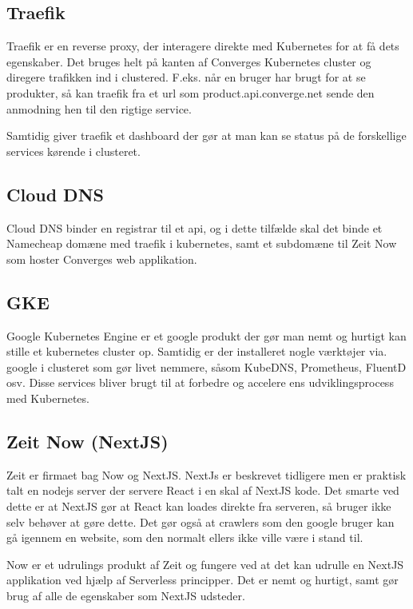 \subsection{Traefik}

Traefik er en reverse proxy, der interagere direkte med Kubernetes for at få dets egenskaber. Det bruges helt på kanten af Converges Kubernetes cluster og diregere trafikken ind i clustered. F.eks. når en bruger har brugt for at se produkter, så kan traefik fra et url som product.api.converge.net sende den anmodning hen til den rigtige service.

Samtidig giver traefik et dashboard der gør at man kan se status på de forskellige services kørende i clusteret.

\subsection{Cloud DNS}

Cloud DNS binder en registrar til et api, og i dette tilfælde skal det binde et Namecheap domæne med traefik i kubernetes, samt et subdomæne til Zeit Now som hoster Converges web applikation.

\subsection{GKE}

Google Kubernetes Engine er et google produkt der gør man nemt og hurtigt kan stille et kubernetes cluster op. Samtidig er der installeret nogle værktøjer via. google i clusteret som gør livet nemmere, såsom KubeDNS, Prometheus, FluentD osv. Disse services bliver brugt til at forbedre og accelere ens udviklingsprocess med Kubernetes.

\subsection{Zeit Now (NextJS)}

Zeit er firmaet bag Now og NextJS. NextJs er beskrevet tidligere men er praktisk talt en nodejs server der servere React i en skal af NextJS kode. Det smarte ved dette er at NextJS gør at React kan loades direkte fra serveren, så bruger ikke selv behøver at gøre dette. Det gør også at crawlers som den google bruger kan gå igennem en website, som den normalt ellers ikke ville være i stand til. 

Now er et udrulings produkt af Zeit og fungere ved at det kan udrulle en NextJS applikation ved hjælp af Serverless principper. Det er nemt og hurtigt, samt gør brug af alle de egenskaber som NextJS udsteder.